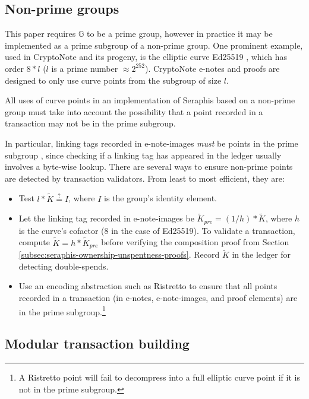 \subsection{Non-prime groups}
\label{subsec:implementers-non-prime-groups}

This paper requires $\mathbb{G}$ to be a prime group, however in practice it may be implemented as a prime subgroup of a non-prime group. One prominent example, used in CryptoNote \cite{cryptoNoteWhitePaper} and its progeny, is the elliptic curve Ed25519 \cite{Bernstein2012-high-speed-high-security-ed25519}, which has order $8*l$ ($l$ is a prime number $\approx 2^{252}$). CryptoNote e-notes and proofs are designed to only use curve points from the subgroup of size $l$.

All uses of curve points in an implementation of Seraphis based on a non-prime group must take into account the possibility that a point recorded in a transaction may not be in the prime subgroup.

In particular, linking tags recorded in e-note-images {\em must} be points in the prime subgroup \cite{key-image-bug}, since checking if a linking tag has appeared in the ledger usually involves a byte-wise lookup. There are several ways to ensure non-prime points are detected by transaction validators. From least to most efficient, they are:

\begin{itemize}
    \item Test $l*\tilde{K} \stackrel{?}{=} I$, where $I$ is the group's identity element.

    \item Let the linking tag recorded in e-note-images be $\tilde{K}_{pre} = (1/h)*\tilde{K}$, where $h$ is the curve's cofactor (8 in the case of Ed25519). To validate a transaction, compute $\tilde{K} = h*\tilde{K}_{pre}$ before verifying the composition proof from Section \ref{subsec:seraphis-ownership-unspentness-proofs}. Record $\tilde{K}$ in the ledger for detecting double-spends.

    \item Use an encoding abstraction such as Ristretto \cite{ristretto} to ensure that all points recorded in a transaction (in e-notes, e-note-images, and proof elements) are in the prime subgroup.\footnote{A Ristretto point will fail to decompress into a full elliptic curve point if it is not in the prime subgroup.}
\end{itemize}


\subsection{Modular transaction building}
\label{subsec:implementers-modular-tx-building}

